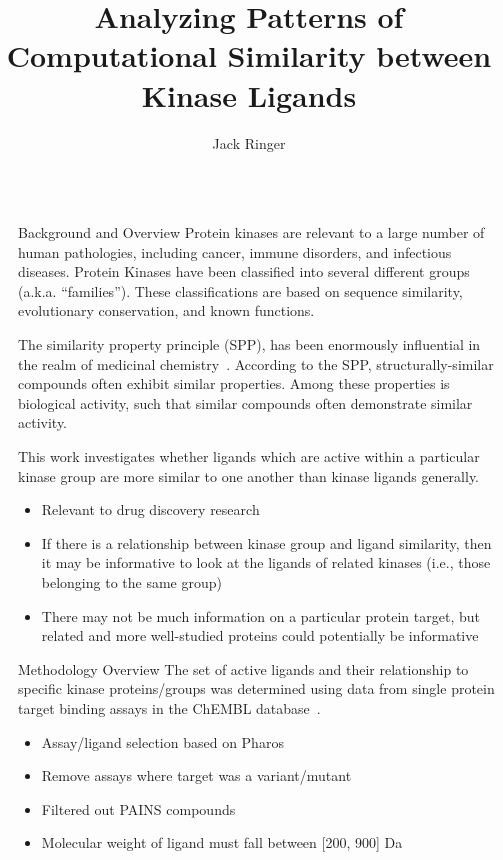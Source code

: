 \documentclass[final]{beamer}
\title{Analyzing Patterns of Computational Similarity between Kinase Ligands}
\author{Jack Ringer}
\institute[shortinst]{University of New Mexico}
\newlength{\sepwidth}
\newlength{\colwidth}
\newcommand{\separatorcolumn}{\begin{column}{\sepwidth}\end{column}}
\begin{document}
\begin{frame}[t]
\begin{columns}[t]
\separatorcolumn

\begin{column}{\colwidth}

  \begin{block}{Background and Overview}
   Protein kinases are relevant to a large number of human pathologies, including cancer, immune disorders, and infectious diseases. Protein Kinases have been classified into several different groups (a.k.a. ``families''). These classifications are based on sequence similarity, evolutionary conservation, and known functions. 


The similarity property principle (SPP), has been enormously influential in the realm of medicinal chemistry~\cite{maggiora_vogt_stumpfe_bajorath_2013}. According to the SPP, structurally-similar compounds often exhibit similar properties. Among these properties is biological activity, such that similar compounds often demonstrate similar activity. 

This work investigates whether ligands which are active within a particular kinase group are more similar to one another than kinase ligands generally. 
    \begin{itemize}
        \item Relevant to drug discovery research
        \item If there is a relationship between kinase group and ligand similarity, then it may be informative to look at the ligands of related kinases (i.e., those belonging to the same group)
        \item There may not be much information on a particular protein target, but related and more well-studied proteins could potentially be informative
    \end{itemize}

  \end{block}

  \begin{block}{Methodology Overview}
    The set of active ligands and their relationship to specific kinase proteins/groups was determined using data from single protein target binding assays in the ChEMBL database~\cite{chembl_db_2023}. 
    \begin{itemize}
        \item Assay/ligand selection based on Pharos~\cite{pharos_2022}
        \item Remove assays where target was a variant/mutant
        \item Filtered out PAINS compounds
        \item Molecular weight of ligand must fall between [200, 900] Da
    \end{itemize}


\end{block}
\end{column}
\end{columns}
\end{frame}
\end{document}
